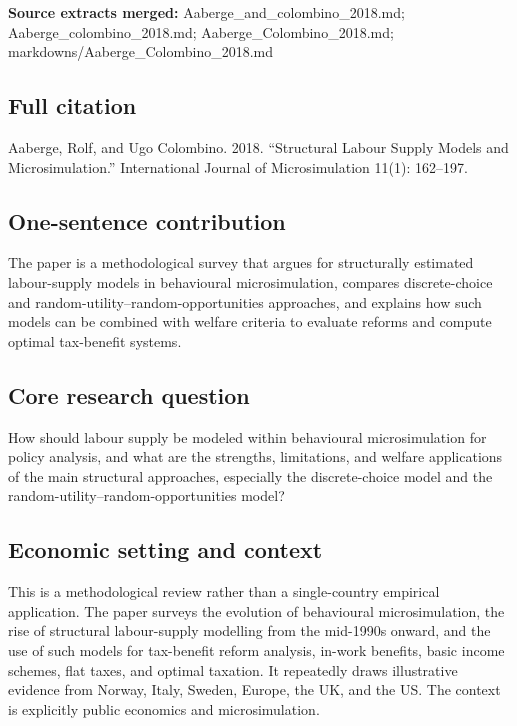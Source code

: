 \documentclass[11pt,a4paper]{article}
\begin{document}
\textbf{Source extracts merged:} Aaberge\_and\_colombino\_2018.md; Aaberge\_colombino\_2018.md; Aaberge\_Colombino\_2018.md; markdowns/Aaberge\_Colombino\_2018.md

\subsection*{Full citation}
Aaberge, Rolf, and Ugo Colombino. 2018. “Structural Labour Supply Models and Microsimulation.” International Journal of Microsimulation 11(1): 162–197.

\subsection*{One-sentence contribution}
The paper is a methodological survey that argues for structurally estimated labour-supply models in behavioural microsimulation, compares discrete-choice and random-utility–random-opportunities approaches, and explains how such models can be combined with welfare criteria to evaluate reforms and compute optimal tax-benefit systems.

\subsection*{Core research question}
How should labour supply be modeled within behavioural microsimulation for policy analysis, and what are the strengths, limitations, and welfare applications of the main structural approaches, especially the discrete-choice model and the random-utility–random-opportunities model?

\subsection*{Economic setting and context}
This is a methodological review rather than a single-country empirical application. The paper surveys the evolution of behavioural microsimulation, the rise of structural labour-supply modelling from the mid-1990s onward, and the use of such models for tax-benefit reform analysis, in-work benefits, basic income schemes, flat taxes, and optimal taxation. It repeatedly draws illustrative evidence from Norway, Italy, Sweden, Europe, the UK, and the US. The context is explicitly public economics and microsimulation.
\end{document}
